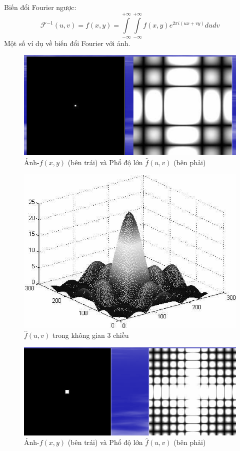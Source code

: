 \documentclass[12pt,a4paper]{report}
\numberwithin{equation}{section}
\theoremstyle{definition} %
\begin{document}
Biến đổi Fourier ngược:
\begin{equation}
\mathcal{F}^{-1}(u,v) =f(x,y)= \int\limits_{-\infty}^{+\infty}\int\limits_{-\infty}^{+\infty}f(x,y)e^{2\pi i(ux+vy)}dudv
\end{equation}
Một số ví dụ về biến đổi Fourier với ảnh.
		 \begin{figure}[H]
			\centering
			\includegraphics[width = 0.8\linewidth]{img/anhVaphodolon1.png}
			\caption{Ảnh-$f(x,y)$ (bên trái) và Phổ độ lớn $\hat{f}(u,v)$ (bên phải)}
		 \end{figure}
		 \begin{figure}[H]
			\centering
			\includegraphics[width = 0.8\linewidth]{img/anhVaphodolon1-3d.png}
			\caption{$\hat{f}(u,v)$ trong không gian 3 chiều}
		 \end{figure}
		  \begin{figure}[H]
			\centering
			\includegraphics[width = 0.8\linewidth]{img/anhVaphodolon2.png}
			\caption{Ảnh-$f(x,y)$ (bên trái) và Phổ độ lớn $\hat{f}(u,v)$ (bên phải)}
		 \end{figure}
\end{document}
